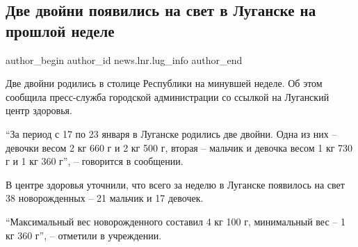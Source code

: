  
 
 
 
 
 
\subsection{Две двойни появились на свет в Луганске на прошлой неделе}
\label{sec:24_01_2022.stz.news.lnr.lug_info.2.dvojni}
 
\ifcmt
 author_begin
   author_id news.lnr.lug_info
 author_end
\fi

Две двойни родились в столице Республики на минувшей неделе. Об этом сообщила
пресс-служба городской администрации со ссылкой на Луганский центр здоровья.

\enquote{За период с 17 по 23 января в Луганске родились две двойни. Одна из
них – девочки весом 2 кг 660 г и 2 кг 500 г, вторая – мальчик и девочка весом 1
кг 730 г и 1 кг 360 г}, – говорится в сообщении.

В центре здоровья уточнили, что всего за неделю в Луганске появилось на свет 38
новорожденных – 21 мальчик и 17 девочек.

\enquote{Максимальный вес новорожденного составил 4 кг 100 г, минимальный вес –
1 кг 360 г}, – отметили в учреждении.
